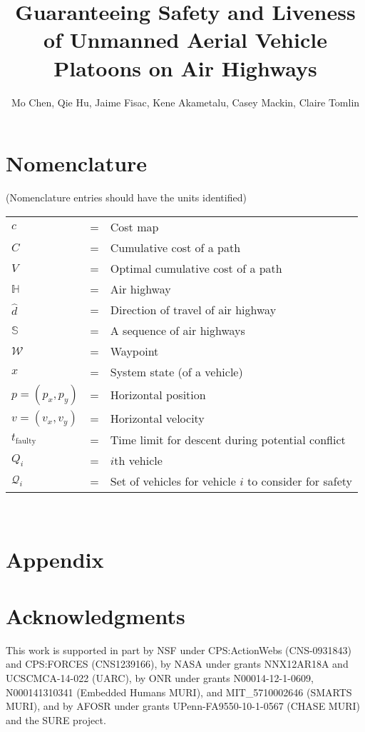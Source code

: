 \documentclass[submit]{aiaa-pretty}
\author{Mo Chen, Qie Hu, Jaime Fisac, Kene Akametalu, Casey Mackin, Claire Tomlin}
\title{Guaranteeing Safety and Liveness of Unmanned Aerial Vehicle Platoons on Air Highways}
\newcommand{\pos}{p} %
\newcommand{\vel}{v} %
\newcommand{\hw}{\mathbb{H}} %
\newcommand{\hws}{\mathbb{S}} %
\newcommand{\hwd}{\hat{d}}
\newcommand{\wpt}{\mathcal{W}}
\newcommand{\cmap}{c}
\newcommand{\ccost}{C}
\newcommand{\ocost}{V}
\newcommand{\td}{t_\text{faulty}} %
\newcommand{\veh}[1]{Q_{#1}}
\newcommand{\vehSCS}[1]{\mathcal{Q}_{#1}} %
\begin{document}
\maketitle

\section*{Nomenclature}
(Nomenclature entries should have the units identified)\\
\noindent\begin{tabular}{@{}lcl@{}}
$\cmap$ &=& Cost map \\
$\ccost$ &=& Cumulative cost of a path \\
$\ocost$ &=& Optimal cumulative cost of a path \\
$\hw$ &=& Air highway \\
$\hwd$ &=& Direction of travel of air highway \\
$\hws$ &=& A sequence of air highways \\
$\wpt$ &=& Waypoint \\
$x$ &=& System state (of a vehicle) \\
$\pos=(\pos_x, \pos_y)$ &=& Horizontal position \\
$\vel=(\vel_x, \vel_y)$ &=& Horizontal velocity \\
$\td$ &=& Time limit for descent during potential conflict \\
$\veh{i}$ &=& $i$th vehicle \\
$\vehSCS{i}$ &=& Set of vehicles for vehicle $i$ to consider for safety 
\end{tabular} \\















\section*{Appendix}

\section*{Acknowledgments}
This work is supported in part by NSF under CPS:ActionWebs (CNS-0931843) and CPS:FORCES (CNS1239166), by NASA under grants NNX12AR18A and UCSCMCA-14-022 (UARC), by ONR under grants N00014-12-1-0609, N000141310341 (Embedded Humans MURI), and MIT\_5710002646 (SMARTS MURI), and by AFOSR under grants UPenn-FA9550-10-1-0567 (CHASE MURI) and the SURE project.



\end{document}

